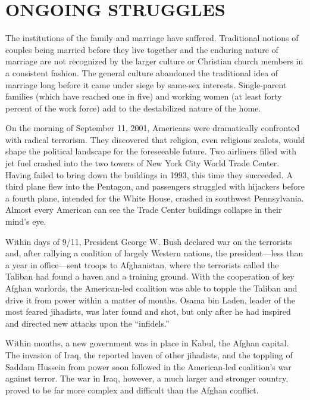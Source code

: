 \section{ONGOING STRUGGLES}

The institutions of the family and marriage have suffered. Traditional notions of couples being
married before they live together and the enduring nature of marriage are not recognized by the
larger culture or Christian church members in a consistent fashion. The general culture abandoned
the traditional idea of marriage long before it came under siege by same-sex interests.
Single-parent families (which have reached one in five) and working women (at least forty percent of
the work force) add to the destabilized nature of the home.

On the morning of September 11, 2001, Americans were dramatically confronted with radical terrorism.
They discovered that religion, even religious zealots, would shape the political landscape for the
foreseeable future. Two airliners filled with jet fuel crashed into the two towers of New York City
World Trade Center. Having failed to bring down the buildings in 1993, this time they succeeded. A
third plane flew into the Pentagon, and passengers struggled with hijackers before a fourth plane,
intended for the White House, crashed in southwest Pennsylvania. Almost every American can see the
Trade Center buildings collapse in their mind’s eye.

Within days of 9/11, President George W. Bush declared war on the terrorists and, after rallying a
coalition of largely Western nations, the president—less than a year in office—sent troops to
Afghanistan, where the terrorists called the Taliban had found a haven and a training ground. With
the cooperation of key Afghan warlords, the American-led coalition was able to topple the Taliban
and drive it from power within a matter of months. Osama bin Laden, leader of the most feared
jihadists, was later found and shot, but only after he had inspired and directed new attacks upon
the “infidels.”

Within months, a new government was in place in Kabul, the Afghan capital. The invasion of Iraq, the
reported haven of other jihadists, and the toppling of Saddam Hussein from power soon followed in
the American-led coalition’s war against terror. The war in Iraq, however, a much larger and
stronger country, proved to be far more complex and difficult than the Afghan conflict.

